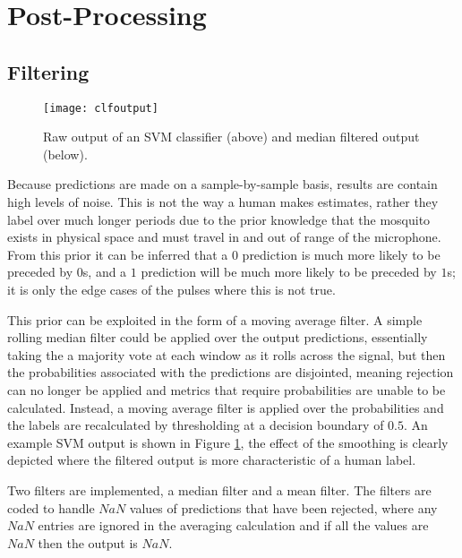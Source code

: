 \section{Post-Processing}
\label{sec:pl-postproc}
    \subsection{Filtering}
    \label{subsec:pl-postproc-filt}
        \begin{figure}[ht]
            \centering
            \texttt{[image: clfoutput]}
            \caption{Raw output of an SVM classifier (above) and median filtered output (below).}
            \label{fig:epl-postproc-filt-output}
        \end{figure}
        Because predictions are made on a sample-by-sample basis, results are contain high levels of noise. This is not the way a human makes estimates, rather they label over much longer periods due to the prior knowledge that the mosquito exists in physical space and must travel in and out of range of the microphone. From this prior it can be inferred that a $0$ prediction is much more likely to be preceded by $0$s, and a $1$ prediction will be much more likely to be preceded by $1$s; it is only the edge cases of the pulses where this is not true. 
        
        This prior can be exploited in the form of a moving average filter. A simple rolling median filter could be applied over the output predictions, essentially taking the a majority vote at each window as it rolls across the signal, but then the probabilities associated with the predictions are disjointed, meaning rejection can no longer be applied and metrics that require probabilities are unable to be calculated. Instead, a moving average filter is applied over the probabilities and the labels are recalculated by thresholding at a decision boundary of $0.5$. An example SVM output is shown in Figure \ref {fig:epl-postproc-filt-output}, the effect of the smoothing is clearly depicted where the filtered output is more characteristic of a human label. 
        
        Two filters are implemented, a median filter and a mean filter. The filters are coded to handle $NaN$ values of predictions that have been rejected, where any $NaN$ entries are ignored in the averaging calculation and if all the values are $NaN$ then the output is $NaN$.
        
